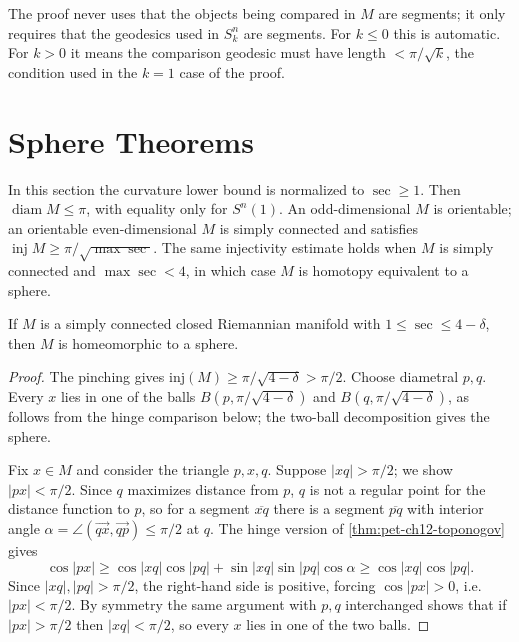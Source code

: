 \begin{remark}
  \label{rem:pet-ch12-toponogov-segment-remark}
  The proof never uses that the objects being compared in $M$ are segments; it
  only requires that the geodesics used in $S_k^n$ are segments. For $k\le0$
  this is automatic. For $k>0$ it means the comparison geodesic must have length
  $<\pi/\sqrt k$, the condition used in the $k=1$ case of the proof.
\end{remark}

\section{Sphere Theorems}

In this section the curvature lower bound is normalized to $\sec\ge1$. Then
$\operatorname{diam}M\le\pi$, with equality only for $S^n(1)$. An odd-dimensional
$M$ is orientable; an orientable even-dimensional $M$ is simply connected and
satisfies $\operatorname{inj}M\ge\pi/\sqrt{\max\sec}$. The same injectivity
estimate holds when $M$ is simply connected and $\max\sec<4$, in which case
$M$ is homotopy equivalent to a sphere.

\begin{theorem}
  \label{thm:pet-ch12-quarter-pinched-sphere}
  If $M$ is a simply connected closed Riemannian manifold with
  $1\le\sec\le4-\delta$, then $M$ is homeomorphic to a sphere.
\end{theorem}
\begin{proof}
  \sketch
  The pinching gives $\mathrm{inj}(M)\ge\pi/\sqrt{4-\delta}>\pi/2$. Choose
  diametral $p,q$. Every $x$ lies in one of the balls
  $B(p,\pi/\sqrt{4-\delta})$ and $B(q,\pi/\sqrt{4-\delta})$, as follows from
  the hinge comparison below; the two-ball decomposition gives the sphere.

  Fix $x\in M$ and consider the triangle $p,x,q$. Suppose $|xq|>\pi/2$; we show
  $|px|<\pi/2$. Since $q$ maximizes distance from $p$, $q$ is not a regular
  point for the distance function to $p$, so for a segment $\overline{xq}$
  there is a segment $\overline{pq}$ with interior angle
  $\alpha=\angle(\overrightarrow{qx},\overrightarrow{qp})\le\pi/2$ at $q$. The
  hinge version of \cref{thm:pet-ch12-toponogov} gives
  \[
    \cos|px|\ge\cos|xq|\cos|pq|+\sin|xq|\sin|pq|\cos\alpha\ge\cos|xq|\cos|pq|.
  \]
  Since $|xq|,|pq|>\pi/2$, the right-hand side is positive, forcing
  $\cos|px|>0$, i.e.\ $|px|<\pi/2$. By symmetry the same argument with $p,q$
  interchanged shows that if $|px|>\pi/2$ then $|xq|<\pi/2$, so every $x$ lies
  in one of the two balls.
\end{proof}


